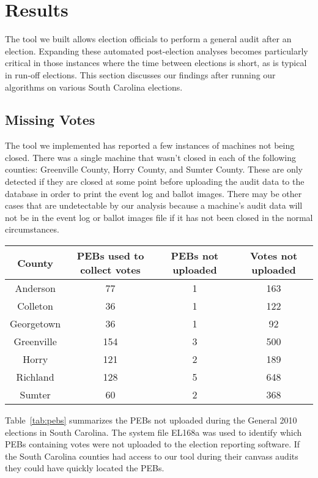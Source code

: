 \section{Results}
The tool we built allows election officials to perform a general audit after an election.  Expanding these automated post-election analyses becomes particularly critical in those instances where the time between elections is short, as is typical in run-off elections.  This section discusses our findings after running our algorithms on various South Carolina elections.  

\subsection{Missing Votes}
The tool we implemented has reported a few instances of machines not being closed.  There was a single machine that wasn't closed in each of the following counties: Greenville County, Horry County, and Sumter County.  These are only detected if they are closed at some point before uploading the audit data to the database in order to print the event log and ballot images.  There may be other cases that are undetectable by our analysis because a machine's audit data will not be in the event log or ballot images file if it has not been closed in the normal circumstances.

\begin{table*}
    \begin{center}
    \begin{tabular}{| c | c | c | c |}
    \hline                   
    County &PEBs used to collect votes &PEBs not uploaded &Votes not uploaded\\
    \hline
    Anderson &77 &1 &163\\
    \hline
    Colleton &36 &1 &122\\
    \hline
    Georgetown &36 &1 &92\\
    \hline
    Greenville &154 &3 &500\\
    \hline
    Horry &121 &2 &189\\
    \hline
    Richland &128 &5 &648\\
    \hline
    Sumter &60 &2 &368\\
    \hline
    \end{tabular}
    \end{center}
    \caption{PEBs not uploaded}
    \label{tab:pebs}
\end{table*}

Table~\ref{tab:pebs} summarizes the PEBs not uploaded during the General 2010 elections in South Carolina. The system file EL168a was used to identify which PEBs containing votes were not uploaded to the election reporting software. If the South Carolina counties had access to our tool during their canvass audits they could have quickly located the PEBs.

